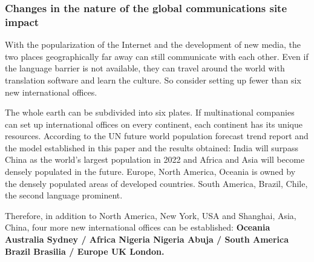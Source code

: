 \subsubsection{Changes in the nature of the global communications site impact}
\noindent With the popularization of the Internet and the development of new media, the two places geographically far away can still communicate with each other. Even if the language barrier is not available, they can travel around the world with translation software and learn the culture. So consider setting up fewer than six new international offices.
\par The whole earth can be subdivided into six plates. If multinational companies can set up international offices on every continent, each continent has its unique resources. According to the UN future world population forecast trend report and the model established in this paper and the results obtained: India will surpass China as the world's largest population in 2022 and Africa and Asia will become densely populated in the future. Europe, North America, Oceania is owned by the densely populated areas of developed countries. South America, Brazil, Chile, the second language prominent.
\par Therefore, in addition to North America, New York, USA and Shanghai, Asia, China, four more new international offices can be established: \textbf{Oceania Australia Sydney / Africa Nigeria Nigeria Abuja / South America Brazil Brasilia / Europe UK London.}

 
